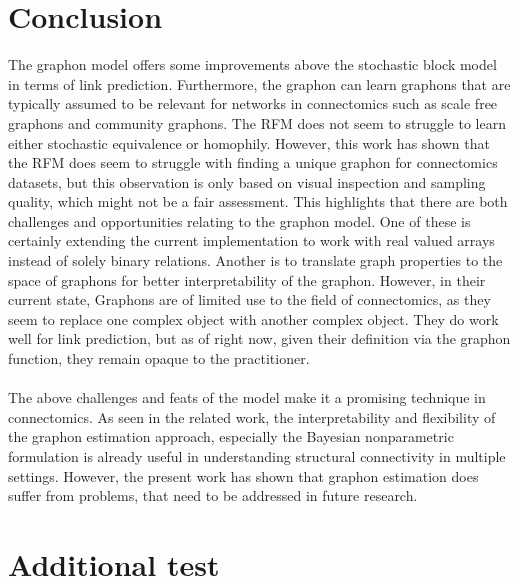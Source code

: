 \documentclass[11pt]{report} %
\begin{document}
\chapter{Conclusion}\label{conclusions}
The graphon model offers some improvements above the stochastic block model in terms of link prediction. Furthermore, the graphon can learn graphons that are typically assumed to be relevant for networks in connectomics such as scale free graphons and community graphons. The RFM does not seem to struggle to learn either stochastic equivalence or homophily. However, this work has shown that the RFM does seem to struggle with finding a unique graphon for connectomics datasets, but this observation is only based on visual inspection and sampling quality, which might not be a fair assessment. This highlights that there are both challenges and opportunities relating to the graphon model. One of these is certainly extending the current implementation to work with real valued arrays instead of solely binary relations. Another is to translate graph properties to the space of graphons for better interpretability of the graphon. However, in their current state, Graphons are of limited use to the field of connectomics, as they seem to replace one complex object with another complex object. They do work well for link prediction, but as of right now, given their definition via the graphon function, they remain opaque to the practitioner. \\\\

The above challenges and feats of the model make it a promising technique in connectomics. As seen in the related work, the interpretability and flexibility of the graphon estimation approach, especially the Bayesian nonparametric formulation is already useful in understanding structural connectivity in multiple settings. However, the present work has shown that graphon estimation does suffer from problems, that need to be addressed in future research.

\appendix 
\chapter{Additional test}
\end{document}
